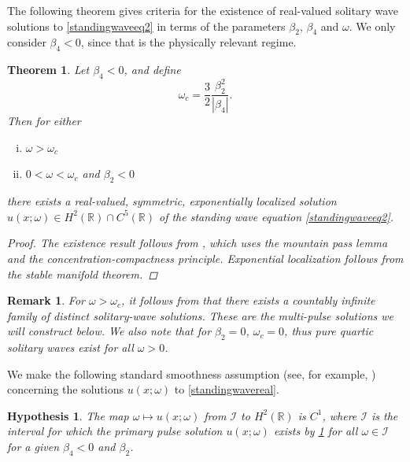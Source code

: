 \documentclass[12pt]{article}
\def\R{{\mathbb R}}
\def\calI{{\mathcal I}}
\newtheorem{theorem}{Theorem}
\newtheorem{hypothesis}{Hypothesis}
\newtheorem{remark}{Remark}
\begin{document}
The following theorem gives criteria for the existence of real-valued solitary wave solutions to \cref{standingwaveeq2} in terms of the parameters $\beta_2$, $\beta_4$ and $\omega$. We only consider $\beta_4 < 0$, since that is the physically relevant regime.

\begin{theorem}\label{theorem:solitonexist}
Let $\beta_4 < 0$, and define
\begin{equation}\label{omegac}
\omega_c = \frac{3}{2} \frac{\beta_2^2}{|\beta_4|}.
\end{equation}
Then for either
\begin{enumerate}[(i)]
\item $\omega > \omega_c$ \\
\item $0 < \omega < \omega_c$ and $\beta_2 < 0$
\end{enumerate}
there exists a real-valued, symmetric, exponentially localized solution $u(x; \omega) \in H^2(\R) \cap C^5(\R)$ of the standing wave equation \cref{standingwaveeq2}. 
\begin{proof}
The existence result follows from \cite{Groves1998}, which uses the mountain pass lemma and the concentration-compactness principle. Exponential localization follows from the stable manifold theorem.
\end{proof}
\end{theorem}

\begin{remark}
For $\omega > \omega_c$, it follows from \cite{Groves1998} that there exists a countably infinite family of distinct solitary-wave solutions. These are the multi-pulse solutions we will construct below. We also note that for $\beta_2 = 0$, $\omega_c = 0$, thus pure quartic solitary waves exist for all $\omega > 0$.
\end{remark}

We make the following standard smoothness assumption (see, for example, \cite[Assumption 2]{Grillakis1987}) concerning the solutions $u(x; \omega)$ to \cref{standingwavereal}.

\begin{hypothesis}\label{hyp:smoothmap}
The map $\omega \mapsto u(x; \omega)$ from $\calI$ to $H^2(\R)$ is $C^1$, where $\calI$ is the interval for which the primary pulse solution $u(x; \omega)$ exists by \cref{theorem:solitonexist} for all $\omega \in \calI$ for a given $\beta_4 < 0$ and $\beta_2$.
\end{hypothesis}
\end{document}
